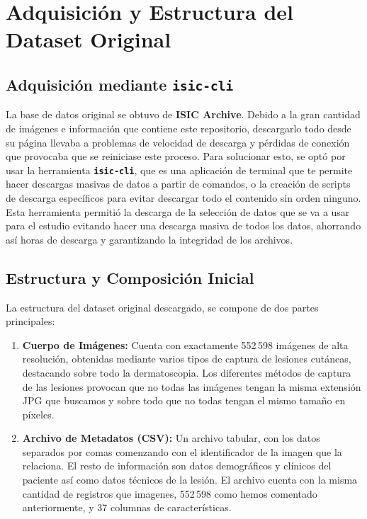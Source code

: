 \section{Adquisición y Estructura del Dataset Original}

\subsection{Adquisición mediante \texttt{isic-cli}}
La base de datos original se obtuvo de \textbf{ISIC Archive}. Debido a la gran cantidad de imágenes e información que contiene este repositorio, descargarlo todo desde su página llevaba a problemas de velocidad de descarga y pérdidas de conexión que provocaba que se reiniciase este proceso. Para solucionar esto, se optó por usar la herramienta \textbf{\texttt{isic-cli}}, que es una aplicación de terminal que te permite hacer descargas masivas de datos a partir de comandos, o la creación de scripts de descarga específicos para evitar descargar todo el contenido sin orden ninguno. Esta herramienta permitió la descarga de la selección de datos que se va a usar para el estudio evitando hacer una descarga masiva de todos los datos, ahorrando así horas de descarga y garantizando la integridad de los archivos.

\subsection{Estructura y Composición Inicial}
La estructura del dataset original descargado, se compone de dos partes principales:
\begin{enumerate}
	\item \textbf{Cuerpo de Imágenes:} Cuenta con exactamente 552\,598 imágenes de alta resolución, obtenidas mediante varios tipos de captura de lesiones cutáneas, destacando sobre todo la dermatoscopia. Los diferentes métodos de captura de las lesiones provocan que no todas las imágenes tengan la misma extensión JPG que buscamos y sobre todo que no todas tengan el mismo tamaño en píxeles.
	\item \textbf{Archivo de Metadatos (CSV):} Un archivo tabular, con los datos separados por comas comenzando con el identificador de la imagen que la relaciona. El resto de información son datos demográficos y clínicos del paciente así como datos técnicos de la lesión. El archivo cuenta con la misma cantidad de registros que imagenes, 552\,598 como hemos comentado anteriormente, y 37 columnas de características.
\end{enumerate}


